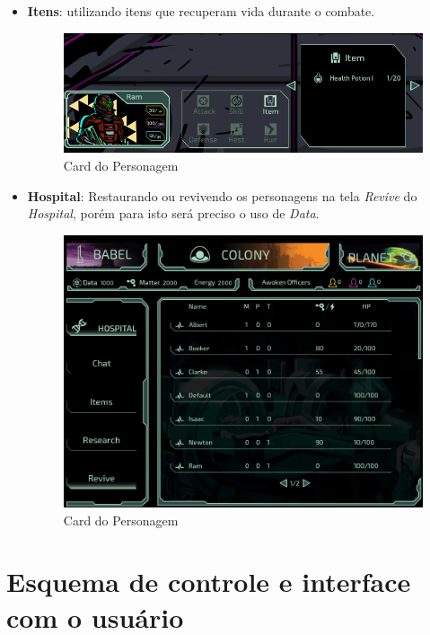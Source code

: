 \documentclass[11pt]{article} %
\begin{document}
\begin{itemize}
  \item \textbf{Itens}: utilizando itens que recuperam vida durante o combate.
    \begin{figure}[!htp]
    \centering
    \includegraphics[scale=0.35]{res/item_combat.png}
    \caption{Card do Personagem}
    \label{Card do Personagem}
    \end{figure}
  \item \textbf{Hospital}: Restaurando ou revivendo os personagens na tela \textit{Revive} do \textit{Hospital}, porém para isto será preciso o uso de \textit{Data}.
    \begin{figure}[!htp]
    \centering
    \includegraphics[scale=0.3]{res/revive.png}
    \caption{Card do Personagem}
    \label{Card do Personagem}
    \end{figure}
\end{itemize}

\section{Esquema de controle e interface com o usuário}
\end{document}
